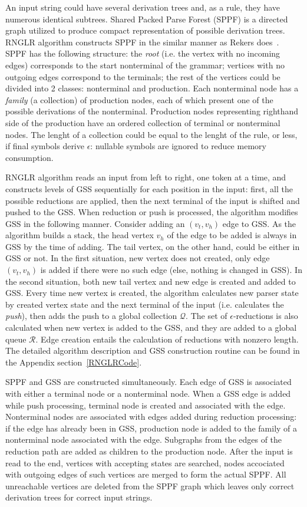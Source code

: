 An input string could have several derivation trees and, as a rule, they have 
numerous identical subtrees. Shared Packed Parse Forest (SPPF) is a directed graph
utilized to produce compact representation of possible derivation trees. RNGLR 
algorithm constructs SPPF in the similar manner as Rekers does~\cite{SPPF}. 
SPPF has the following structure: the \emph{root} (i.e. the vertex
with no incoming edges) corresponds to the start nonterminal of the grammar; vertices 
with no outgoing edges correspond to the terminals; the rest of the vertices could be 
divided into 2 classes: nonterminal and production. Each nonterminal node has a 
\emph{family} (a collection) of production nodes, each of which present one of the 
possible derivations of the nonterminal. Production nodes representing righthand side 
of the production have an ordered collection of terminal or nonterminal nodes. The 
lenght of a collection could be equal to the lenght of the rule, or less, if final 
symbols derive $\epsilon$: nullable symbols are ignored to reduce memory consumption. 

RNGLR algorithm reads an input from left to right, one token at a time, and 
constructs levels of GSS sequentially for each position in the input: first, all the 
possible reductions are applied, then the next terminal of the input is shifted and
pushed to the GSS. When reduction or push is processed, the algorithm modifies GSS in 
the following manner. Consider adding an $(v_{t}, v_{h})$ edge to GSS. As the algorithm
builds a stack, the head vertex $v_{h}$ of the edge to be added is always in GSS by the 
time of adding. The tail vertex, on the other hand, could be either in GSS or not. In 
the first situation, new vertex does not created, only edge $(v_{t}, v_{h})$ is added 
if there were no such edge (else, nothing is changed in GSS). In the second situation, 
both new tail vertex and new edge is created and added to GSS. Every time new vertex
is created, the algorithm calculates new parser state by created vertex state and the 
next terminal of the input (i.e. calculates the \emph{push}), then adds the push to a
global collection $\mathcal{Q}$. The set of $\epsilon$-reductions is also calculated 
when new vertex is added to the GSS, and they are added to a global queue $\mathcal{R}$.
Edge creation entails the calculation of reductions with nonzero length. The detailed 
algorithm description and GSS construction routine can be found in the Appendix 
section~\ref{RNGLRCode}. 

SPPF and GSS are constructed simultaneously. Each edge of GSS is associated with either 
a terminal node or a nonterminal node. When a GSS edge is added while push processing, 
terminal node is created and associated with the edge. Nonterminal nodes are associated
with edges added during reduction processing: if the edge has already been in GSS, 
production node is added to the family of a nonterminal node associated with the edge.
Subgraphs from the edges of the reduction path are added as children to the production
node. After the input is read to the end, vertices with accepting states are searched,
nodes accociated with outgoing edges of such vertices are merged to form the actual
SPPF. All unreachable vertices are deleted from the SPPF graph which leaves only 
correct derivation trees for correct input strings.